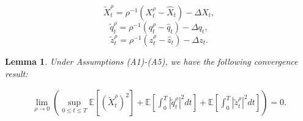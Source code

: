 \documentclass[11pt,a4paper]{article}
\newtheorem{lemma}[theo]{Lemma}
\begin{document}
$$\tilde{X}^\rho_t=\rho^{-1}({X}^\rho_t- \hat {X}_t)-\Delta{X}_t,$$
$$\tilde{q}^\rho_t=\rho^{-1}({q}^\rho_t-\hat {q}_t )-\Delta{q}_t,$$
$$\tilde{z}^\rho_t=\rho^{-1}(z^\rho_t-\hat z_t)-\Delta{z}_t .$$

\begin{lemma}
\label{convergence lemma}
Under Assumptions \emph{(A1)-(A5)}, we have the following convergence result:  
\end{lemma}
\begin{equation}
\label{convergence results CN}
    \begin{aligned}
\lim_{\rho \to 0} \left( \sup_{0 \leq t \leq T} \mathbb E\left[(\tilde{X}^\rho_t)^2 \right] + \mathbb E\left[\int_0^T|\tilde{q}^\rho_t|^2dt \right] + \mathbb E\left[\int_0^T|\tilde{z}^\rho_t|^2dt \right] \right) =0 .
    \end{aligned}
\end{equation}
\end{document}
